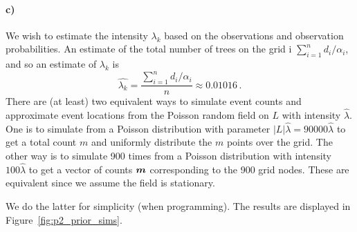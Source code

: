 \paragraph{c)}
We wish to estimate the intensity $\lambda_k$ based on the observations and observation probabilities. An estimate of the total number of trees on the grid i $\sum_{i=1}^n d_i / \alpha_i$, and so an estimate of $\lambda_k$ is
%
\begin{equation*}
    \hat{\lambda_k} = \frac{\sum_{i=1}^n d_i / \alpha_i}{n} \approx 0.01016 \, .
\end{equation*}
%
There are (at least) two equivalent ways to simulate event counts and approximate event locations from the Poisson random field on $L$ with intensity $\hat{\lambda}$. One is to simulate from a Poisson distribution with parameter $|L|\hat{\lambda} = 90000\hat{\lambda}$ to get a total count $m$ and uniformly distribute the $m$ points over the grid. The other way is to simulate 900 times from a Poisson distribution with intensity $100\hat{\lambda}$ to get a vector of counts $\bm{m}$ corresponding to the 900 grid nodes. These are equivalent since we assume the field is stationary.

We do the latter for simplicity (when programming). The results are displayed in Figure~\ref{fig:p2_prior_sims}.

